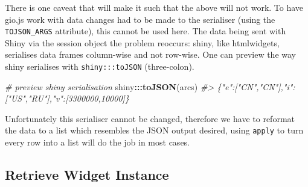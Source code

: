 \documentclass[
]{krantz}
\makeatletter
\newenvironment{Shaded}{\begin{snugshade}}{\end{snugshade}}
\newcommand{\CommentTok}[1]{\textcolor[rgb]{0.37,0.37,0.37}{\textit{#1}}}
\newcommand{\ControlFlowTok}[1]{\textcolor[rgb]{0.27,0.27,0.27}{\textbf{#1}}}
\newcommand{\DataTypeTok}[1]{\textcolor[rgb]{0.27,0.27,0.27}{#1}}
\newcommand{\DecValTok}[1]{\textcolor[rgb]{0.06,0.06,0.06}{#1}}
\newcommand{\KeywordTok}[1]{\textcolor[rgb]{0.27,0.27,0.27}{\textbf{#1}}}
\newcommand{\NormalTok}[1]{#1}
\newcommand{\OperatorTok}[1]{\textcolor[rgb]{0.43,0.43,0.43}{\textbf{#1}}}
\newcommand{\StringTok}[1]{\textcolor[rgb]{0.5,0.5,0.5}{#1}}
\newenvironment{kframe}{%
\medskip{}
\setlength{\fboxsep}{.8em}
 \def\at@end@of@kframe{}%
 \ifinner\ifhmode%
  \def\at@end@of@kframe{\end{minipage}}%
  \begin{minipage}{\columnwidth}%
 \fi\fi%
 \def\FrameCommand##1{\hskip\@totalleftmargin \hskip-\fboxsep
 \colorbox{shadecolor}{##1}\hskip-\fboxsep
     \hskip-\linewidth \hskip-\@totalleftmargin \hskip\columnwidth}%
 \MakeFramed {\advance\hsize-\width
   \@totalleftmargin\z@ \linewidth\hsize
   \@setminipage}}%
 {\par\unskip\endMakeFramed%
 \at@end@of@kframe}
\renewenvironment{Shaded}{\begin{kframe}}{\end{kframe}}
\makeatother
\begin{document}
There is one caveat that will make it such that the above will not work. To have gio.js work with data changes had to be made to the serialiser (using the \texttt{TOJSON\_ARGS} attribute), this cannot be used here. The data being sent with Shiny via the session object the problem reoccurs: shiny, like htmlwidgets, serialises data frames column-wise and not row-wise. One can preview the way shiny serialises with \texttt{shiny:::toJSON} (three-colon).

\begin{Shaded}
\begin{Highlighting}[]
\CommentTok{\# preview shiny serialisation}
\NormalTok{shiny}\OperatorTok{:::}\KeywordTok{toJSON}\NormalTok{(arcs)}
\CommentTok{\#> \{"e":["CN","CN"],"i":["US","RU"],"v":[3300000,10000]\}}
\end{Highlighting}
\end{Shaded}

Unfortunately this serialiser cannot be changed, therefore we have to reformat the data to a list which resembles the JSON output desired, using \texttt{apply} to turn every row into a list will do the job in most cases.

\begin{Shaded}
\end{Shaded}

\hypertarget{shiny-widgets-retrieve}{%
\subsection{Retrieve Widget Instance}\label{shiny-widgets-retrieve}}
\end{document}

